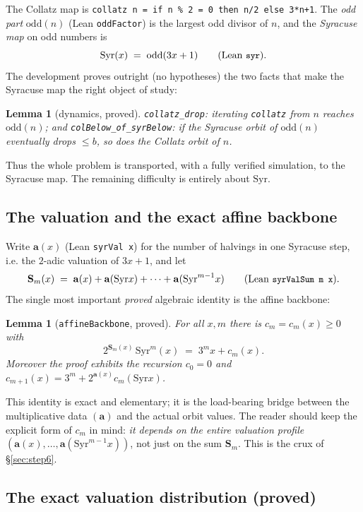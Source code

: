 \documentclass[11pt]{article}
\theoremstyle{plain}
\newtheorem{lem}[thm]{Lemma}
\theoremstyle{definition}
\theoremstyle{remark}
\newcommand{\Syr}{\mathrm{Syr}}
\newcommand{\aval}{\mathbf{a}}
\newcommand{\Ssum}{\mathbf{S}}
\newcommand{\odd}{\mathrm{odd}}
\newcommand{\code}[1]{\texttt{\small #1}}
\begin{document}
The Collatz map is \code{collatz n = if n \% 2 = 0 then n/2 else 3*n+1}. The
\emph{odd part} $\odd(n)$ (Lean \code{oddFactor}) is the largest odd divisor of
$n$, and the \emph{Syracuse map} on odd numbers is
\[
   \Syr(x) \;=\; \odd(3x+1)\qquad (\text{Lean \code{syr}}).
\]
The development proves outright (no hypotheses) the two facts that make the
Syracuse map the right object of study:
\begin{lem}[dynamics, proved]
\code{collatz\_drop}: iterating \code{collatz} from $n$ reaches $\odd(n)$;
and \code{colBelow\_of\_syrBelow}: if the Syracuse orbit of $\odd(n)$ eventually
drops $\le b$, so does the Collatz orbit of $n$.
\end{lem}
Thus the whole problem is transported, with a fully verified simulation, to the
Syracuse map. The remaining difficulty is entirely about $\Syr$.

\subsection{The valuation and the exact affine backbone}

Write $\aval(x)$ (Lean \code{syrVal x}) for the number of halvings in one
Syracuse step, i.e. the $2$-adic valuation of $3x+1$, and let
\[
  \Ssum_m(x) \;=\; \aval(x)+\aval(\Syr x)+\dots+\aval(\Syr^{m-1}x)
  \qquad (\text{Lean \code{syrValSum m x}}).
\]
The single most important \emph{proved} algebraic identity is the affine
backbone:
\begin{lem}[\code{affineBackbone}, proved]\label{lem:backbone}
For all $x,m$ there is $c_m=c_m(x)\ge 0$ with
\[
  2^{\Ssum_m(x)}\,\Syr^m(x) \;=\; 3^m x + c_m(x).
\]
Moreover the proof exhibits the recursion
$c_0=0$ and $c_{m+1}(x)=3^m+2^{\aval(x)}c_m(\Syr x)$.
\end{lem}
This identity is exact and elementary; it is the load-bearing bridge between the
multiplicative data $(\aval)$ and the actual orbit values. The reader should
keep the explicit form of $c_m$ in mind: \emph{it depends on the entire
valuation profile $(\aval(x),\dots,\aval(\Syr^{m-1}x))$}, not just on the sum
$\Ssum_m$. This is the crux of \S\ref{sec:step6}.

\subsection{The exact valuation distribution (proved)}
\end{document}
